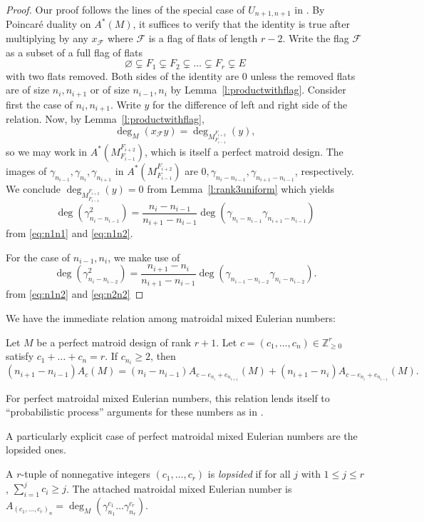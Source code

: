 \documentclass[ALCO,published]{cedram}
\numberwithin{equation}{section}
\numberwithin{figure}{section}
\newcommand{\Z}{\mathbb{Z}}
\newcommand{\cF}{\mathcal{F}}
\begin{document}
\begin{proof}
  Our proof follows the lines of the special case of $U_{n+1,n+1}$ in \cite[Corollary~7.9]{BST}.
  By Poincar\'{e} duality on $A^*(M)$, it suffices to verify that the identity is true after multiplying by any $x_{\cF}$ where $\cF$ is a flag of flats of length $r-2$. Write the flag $\cF$ as a subset of a full flag of flats
  \[\varnothing\subsetneq F_1\subsetneq F_2\subsetneq \dots\subsetneq F_r\subsetneq E\]
  with two flats removed. Both sides of the identity are $0$ unless the removed flats are of size $n_i,n_{i+1}$ or of size $n_{i-1},n_i$ by Lemma~\ref{l:productwithflag}. Consider first the case of $n_i,n_{i+1}$.
  Write $y$ for the difference of left and right side of the relation. Now, by Lemma~\ref{l:productwithflag},
  \[\deg_M(x_{\cF}y)=\deg_{M_{F_{i-1}}^{F_{i+2}}}(y),\]
  so we may work in $A^*(M_{F_{i-1}}^{F_{i+2}})$, which is itself a perfect matroid design.
  The images of $\gamma_{n_{i-1}},\gamma_{n_i},\gamma_{n_{i+1}}$ in $A^*(M_{F_{i-1}}^{F_{i+2}})$ are $0,\gamma_{n_i-n_{i-1}},\gamma_{n_{i+1}-n_{i-1}}$, respectively. We conclude $\deg_{M_{F_{i-1}}^{F_{i+2}}}(y)=0$ from Lemma~\ref{l:rank3uniform} which yields
  \[\deg(\gamma_{n_i-n_{i-1}}^2)=\frac{n_i-n_{i-1}}{n_{i+1}-n_{i-1}}\deg(\gamma_{n_i-n_{i-1}}\gamma_{n_{i+1}-n_{i-1}})\]
  from \eqref{eq:n1n1} and \eqref{eq:n1n2}.

  For the case of $n_{i-1},n_i$, we make use of
  \[\deg(\gamma_{n_i-n_{i-2}}^2)=\frac{n_{i+1}-n_i}{n_{i+1}-n_{i-1}}\deg(\gamma_{n_{i-1}-n_{i-2}}\gamma_{n_i-n_{i-2}}).
  \]
  from \eqref{eq:n1n2} and \eqref{eq:n2n2}
\end{proof}

We have the immediate relation among matroidal mixed Eulerian numbers:

\begin{coro} \label{c:perfectrelation} Let $M$ be a perfect matroid design of rank $r+1$. Let $c=(c_1,\dots,c_n)\in\Z_{\geq 0}^r$ satisfy
$c_1+\dots+c_n=r$. If $c_{n_i}\geq 2$, then
  \[(n_{i+1}-n_{i-1})A_c(M)=(n_i-n_{i-1})A_{c-e_{n_i}+e_{n_{i+1}}}(M)+(n_{i+1}-n_i)A_{c-e_{n_i}+e_{n_{i-1}}}(M).\]
\end{coro}

For perfect matroidal mixed Eulerian numbers, this relation lends itself to ``probabilistic process'' arguments for these numbers as in \cite{NT:remixed}. 

A particularly explicit case of perfect matroidal mixed Eulerian numbers are the lopsided ones. 

\begin{defi}
    A $r$-tuple of nonnegative integers $(c_1,\dots,c_r)$ is {\em lopsided} if for all $j$ with $1\leq j\leq r$, $\sum_{i=1}^j c_i\geq j$.
    The attached matroidal mixed Eulerian number is $A_{(c_1,\dots,c_r)_n}=\deg_M(\gamma_{n_1}^{c_1}\dots\gamma_{n_r}^{c_r})$.
\end{defi}
\end{document}
